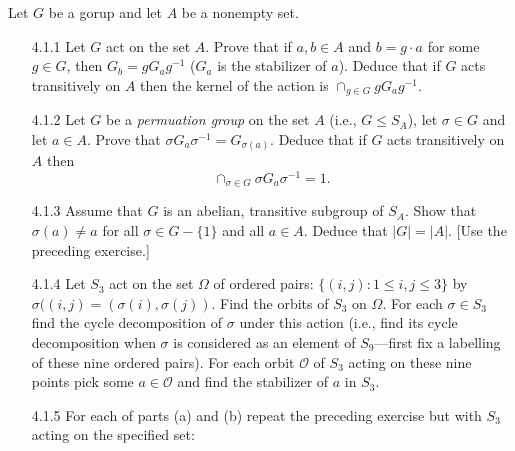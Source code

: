 Let $G$ be a gorup and let $A$ be a nonempty set.

\begin{enumerate}
   \item[4.1.1]   Let $G$ act on the set $A$. Prove that if $a, b \in A$ and
                  $b = g \cdot a$ for some $g \in G$, then $G_b = gG_ag^{-1}$
                  ($G_a$ is the stabilizer of $a$). Deduce that if $G$ acts
                  transitively on $A$ then the kernel of the action is
                  $\cap_{g \in G}gG_ag^{-1}$.
   \item[4.1.2]   Let $G$ be a \textit{permuation group} on the set $A$
                  (i.e., $G \le S_A$), let $\sigma \in G$ and let $a \in A$.
                  Prove that $\sigma G_a \sigma^{-1} = G_{\sigma(a)}$. Deduce
                  that if $G$ acts transitively on $A$ then
                  $$\cap_{\sigma \in G}\sigma G_a\sigma^{-1} = 1.$$
   \item[4.1.3]   Assume that $G$ is an abelian, transitive subgroup of $S_A$.
                  Show that $\sigma(a) \neq a$ for all $\sigma \in G - \{1\}$
                  and all $a \in A$. Deduce that $|G| = |A|$. [Use the preceding
                  exercise.]
   \item[4.1.4]   Let $S_3$ act on the set $\Omega$ of ordered pairs:
                  $\{(i, j) : 1 \le i, j \le 3\}$ by
                  $\sigma((i, j) = (\sigma(i), \sigma(j))$. Find the orbits of
                  $S_3$ on $\Omega$. For each $\sigma \in S_3$ find the cycle
                  decomposition of $\sigma$ under this action (i.e., find its
                  cycle decomposition when $\sigma$ is considered as an element
                  of $S_9$---first fix a labelling of these nine ordered pairs).
                  For each orbit $\mathcal{O}$ of $S_3$ acting on these nine
                  points pick some $a \in \mathcal{O}$ and find the stabilizer
                  of $a$ in $S_3$.
   \item[4.1.5]   For each of parts (a) and (b) repeat the preceding exercise
                  but with $S_3$ acting on the specified set:
                  \begin{enumerate}

\end{enumerate}
\end{enumerate}
